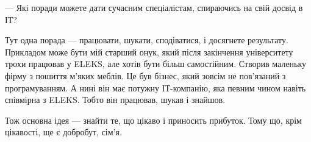 — Які поради можете дати сучасним спеціалістам, спираючись на свій досвід в ІТ?

Тут одна порада — працювати, шукати, сподіватися, і досягнете результату.
Прикладом може бути мій старший онук, який після закінчення університету трохи
працював у ELEKS, але хотів бути більш самостійним. Створив маленьку фірму з
пошиття м’яких меблів. Це був бізнес, який зовсім не пов’язаний з
програмуванням. А нині він має потужну ІТ-компанію, яка певним чином навіть
співмірна з ELEKS. Тобто він працював, шукав і знайшов.

Тож основна ідея — знайти те, що цікаво і приносить прибуток. Тому що, крім
цікавості, ще є добробут, сім’я.
